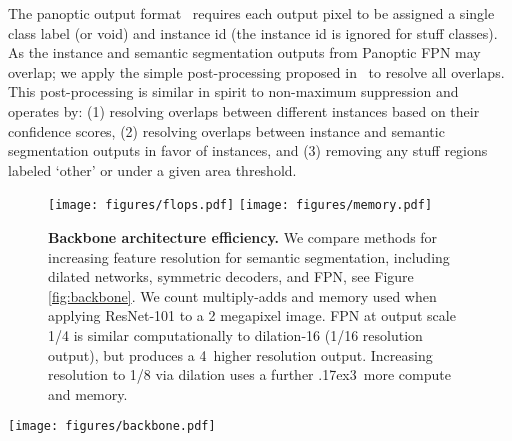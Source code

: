 \documentclass[10pt,twocolumn,letterpaper]{article}
\makeatletter
\newcommand{\app}{\raise.17ex\hbox{}}
\newcommand{\x}{}
\renewcommand\paragraph{\@startsection{paragraph}{4}{\z@}{.5em \@plus1ex \@minus.1ex}{-.5em}{\normalfont\normalsize\bfseries}}
\makeatother
\begin{document}
{\paragraph{Panoptic inference:} The panoptic output format~\cite{kirillov2017panoptic} requires each output pixel to be assigned a single class label (or void) and instance id (the instance id is ignored for stuff classes). As the instance and semantic segmentation outputs from Panoptic FPN may overlap; we apply the simple post-processing proposed in~\cite{kirillov2017panoptic} to resolve all overlaps. This post-processing is similar in spirit to non-maximum suppression and operates by: (1) resolving overlaps between different instances based on their confidence scores, (2) resolving overlaps between instance and semantic segmentation outputs in favor of instances, and (3) removing any stuff regions labeled `other' or under a given area threshold.

\begin{figure}\centering
\texttt{[image: figures/flops.pdf]}
\texttt{[image: figures/memory.pdf]}
\caption{\textbf{Backbone architecture efficiency.} We compare methods for increasing feature resolution for semantic segmentation, including dilated networks, symmetric decoders, and FPN, see Figure \ref{fig:backbone}. We count multiply-adds and memory used when applying ResNet-101 to a 2 megapixel image. FPN at output scale 1/4 is similar computationally to dilation-16 (1/16 resolution output), but produces a 4\x~higher resolution output. Increasing resolution to 1/8 via dilation uses a further \app3\x~more compute and memory.}
\label{fig:efficiency}
\end{figure}


\begin{figure*}
\texttt{[image: figures/backbone.pdf]}
\caption{\textbf{Backbone architectures} for increasing feature resolution. (a) A standard convolutional network (dimensions are denoted as \#blocks\x\#channels\x resolution). (b) A common approach is to reduce the stride of select convolutions and use dilated convolutions after to compensate. (c) A U-Net~\cite{ronneberger2015u} style network uses a \emph{symmetric} decoder that mirrors the bottom-up pathway, but in reverse. (d) FPN can be seen as an \emph{asymmetric}, lightweight decoder whose top-down pathway has only one block per stage and uses a shared channel dimension. For a comparison of the efficiency of these models, please see Figure~\ref{fig:efficiency}.}
\label{fig:backbone}
\end{figure*}


}
\end{document}
